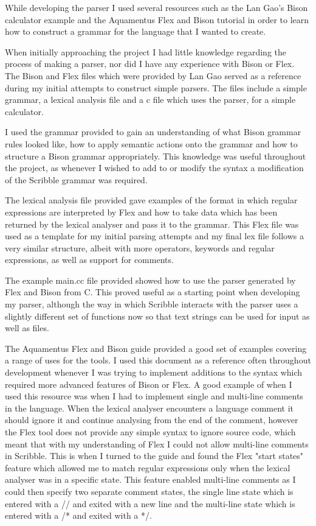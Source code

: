 \documentclass[]{final_report}
\begin{document}
While developing the parser I used several resources such as the Lan Gao's Bison calculator\cite{BISONTUT} example and the Aquamentus Flex and Bison tutorial\cite{AQBISON} in order to learn how to construct a grammar for the language that I wanted to create.

When initially approaching the project I had little knowledge regarding the process of making a parser, nor did I have any experience with Bison or Flex. The Bison and Flex files which were provided by Lan Gao served as a reference during my initial attempts to construct simple parsers. The files include a simple grammar, a lexical analysis file and a c file which uses the parser, for a simple calculator.

I used the grammar provided to gain an understanding of what Bison grammar rules looked like, how to apply semantic actions onto the grammar and how to structure a Bison grammar appropriately. This knowledge was useful throughout the project, as whenever I wished to add to or modify the syntax a modification of the Scribble grammar was required.

The lexical analysis file provided gave examples of the format in which regular expressions are interpreted by Flex and how to take data which has been returned by the lexical analyser and pass it to the grammar. This Flex file was used as a template for my initial parsing attempts and my final lex file follows a very similar structure, albeit with more operators, keywords and regular expressions, as well as support for comments.

The example main.cc file provided showed how to use the parser generated by Flex and Bison from C. This proved useful as a starting point when developing my parser, although the way in which Scribble interacts with the parser uses a slightly different set of functions now so that text strings can be used for input as well as files.

The Aquamentus Flex and Bison guide\cite{AQBISON} provided a good set of examples covering a range of uses for the tools. I used this document as a reference often throughout development whenever I was trying to implement additions to the syntax which required more advanced features of Bison or Flex. A good example of when I used this resource was when I had to implement single and multi-line comments in the language. When the lexical analyser encounters a language comment it should ignore it and continue analysing from the end of the comment, however the Flex tool does not provide any simple syntax to ignore source code, which meant that with my understanding of Flex I could not allow multi-line comments in Scribble. This is when I turned to the guide and found the Flex "start states" feature which allowed me to match regular expressions only when the lexical analyser was in a specific state. This feature enabled multi-line comments as I could then specify two separate comment states, the single line state which is entered with a // and exited with a new line and the multi-line state which is entered with a /* and exited with a */.
\end{document}
